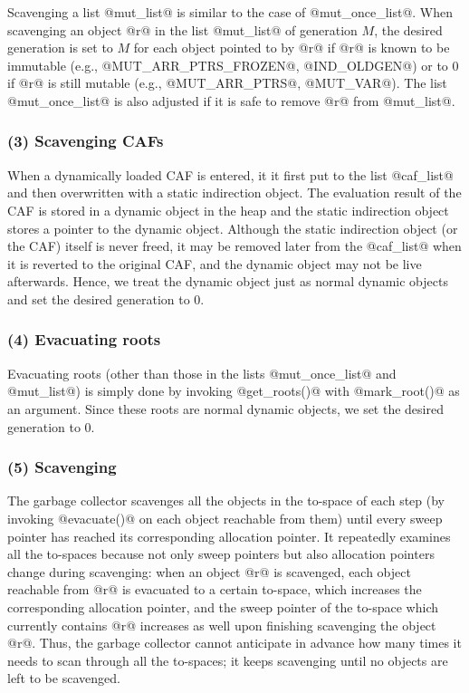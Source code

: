 \documentclass{article}
\begin{document}
Scavenging a list @mut_list@ is similar to the case of @mut_once_list@.
When scavenging an object @r@ in the list @mut_list@ of generation $M$,
the desired generation is set to $M$ for each object pointed to by @r@
if @r@ is known to be immutable (e.g., @MUT_ARR_PTRS_FROZEN@, 
@IND_OLDGEN@)
or to $0$ if @r@ is still mutable (e.g., @MUT_ARR_PTRS@, @MUT_VAR@).
The list @mut_once_list@ is also adjusted if it is safe to remove @r@ from
@mut_list@. 

\subsubsection{(3) Scavenging CAFs}

When a dynamically loaded CAF is entered, it it first put to the list 
@caf_list@ and then overwritten with a static indirection object.
The evaluation result of the CAF is stored in a dynamic object in the heap
and the static indirection object stores a pointer to the dynamic object.
Although the static indirection object (or the CAF) itself is never freed, 
it may be removed later from the @caf_list@ when it is reverted to the 
original CAF, and the dynamic object may not be live afterwards.
Hence, we treat the dynamic object just as normal dynamic objects and
set the desired generation to $0$.

\subsubsection{(4) Evacuating roots}

Evacuating roots (other than those in the lists @mut_once_list@ and 
@mut_list@) is simply done by invoking @get_roots()@ with @mark_root()@
as an argument. 
Since these roots are normal dynamic objects, we set the desired generation
to $0$.

\subsubsection{(5) Scavenging}

The garbage collector scavenges all the objects in the to-space of
each step (by invoking @evacuate()@ on each object reachable from them) 
until every sweep pointer has reached its corresponding 
allocation pointer. 
It repeatedly examines all the to-spaces because not only sweep pointers
but also allocation pointers change during scavenging:
when an object @r@ is scavenged, each object reachable from 
@r@ is evacuated to a certain to-space, which increases the corresponding
allocation pointer, and
the sweep pointer of the to-space which currently contains @r@
increases as well upon finishing scavenging the object @r@.
Thus, the garbage collector cannot anticipate in advance how many times 
it needs to scan through all the to-spaces; it keeps scavenging until
no objects are left to be scavenged.
\end{document}
